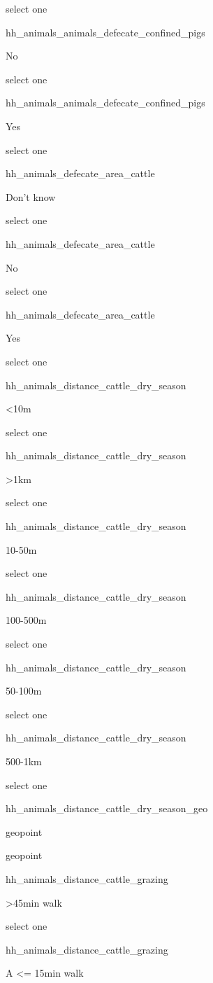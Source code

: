 \documentclass[]{article}
\begin{document}
select one

hh\_animals\_animals\_defecate\_confined\_pigs

No

select one

hh\_animals\_animals\_defecate\_confined\_pigs

Yes

select one

hh\_animals\_defecate\_area\_cattle

Don't know

select one

hh\_animals\_defecate\_area\_cattle

No

select one

hh\_animals\_defecate\_area\_cattle

Yes

select one

hh\_animals\_distance\_cattle\_dry\_season

\textless{}10m

select one

hh\_animals\_distance\_cattle\_dry\_season

\textgreater{}1km

select one

hh\_animals\_distance\_cattle\_dry\_season

10-50m

select one

hh\_animals\_distance\_cattle\_dry\_season

100-500m

select one

hh\_animals\_distance\_cattle\_dry\_season

50-100m

select one

hh\_animals\_distance\_cattle\_dry\_season

500-1km

select one

hh\_animals\_distance\_cattle\_dry\_season\_geo

geopoint

geopoint

hh\_animals\_distance\_cattle\_grazing

\textgreater{}45min walk

select one

hh\_animals\_distance\_cattle\_grazing

A \textless{}= 15min walk
\end{document}
